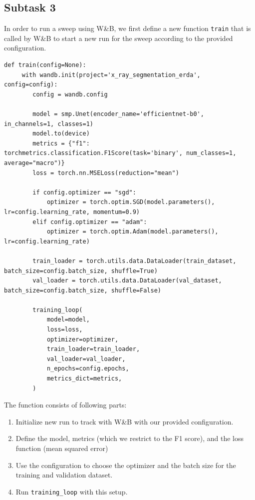 \subsection*{Subtask 3}

In order to run a sweep using W\&B, we first define a new function \lstinline|train| that is called by W\&B to start a new run for the sweep according to the provided configuration.
\begin{lstlisting}
def train(config=None):        
     with wandb.init(project='x_ray_segmentation_erda', config=config):
        config = wandb.config
        
        model = smp.Unet(encoder_name='efficientnet-b0', in_channels=1, classes=1)
        model.to(device)
        metrics = {"f1": torchmetrics.classification.F1Score(task='binary', num_classes=1, average="macro")}
        loss = torch.nn.MSELoss(reduction="mean")
        
        if config.optimizer == "sgd":
            optimizer = torch.optim.SGD(model.parameters(), lr=config.learning_rate, momentum=0.9)
        elif config.optimizer == "adam":
            optimizer = torch.optim.Adam(model.parameters(), lr=config.learning_rate)
        
        train_loader = torch.utils.data.DataLoader(train_dataset, batch_size=config.batch_size, shuffle=True)
        val_loader = torch.utils.data.DataLoader(val_dataset, batch_size=config.batch_size, shuffle=False)
         
        training_loop(
            model=model,
            loss=loss,
            optimizer=optimizer,
            train_loader=train_loader,
            val_loader=val_loader,
            n_epochs=config.epochs,
            metrics_dict=metrics,
        )
\end{lstlisting}


The function consists of following parts:
\begin{enumerate}
    \item Initialize new run to track with W\&B with our provided configuration. 
    \item Define the model, metrics (which we restrict to the F1 score), and the loss function (mean squared error)
    \item Use the configuration to choose the optimizer and the batch size for the training and validation dataset. 
    \item Run \lstinline|training_loop| with this setup.
\end{enumerate}

